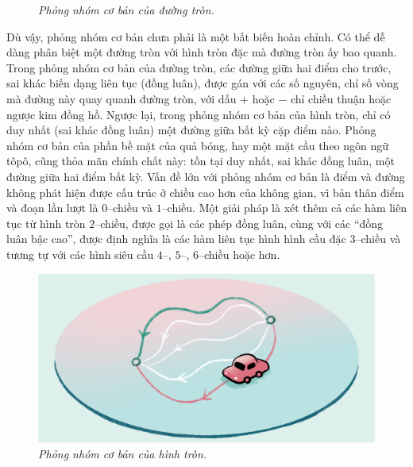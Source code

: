 \begin{multicols}{2}
\begin{figure}[H]
		\caption{\small\textit{\color{duongvaotoanhoc}Phỏng nhóm cơ bản của đường tròn.}}
		\vspace*{-10pt}
	\end{figure}
	Dù vậy, phỏng nhóm cơ bản chưa phải là một bất biến hoàn chỉnh. Có thể dễ dàng phân biệt một đường tròn với hình tròn đặc mà đường tròn ấy bao quanh. Trong phỏng nhóm cơ bản của đường tròn, các đường giữa hai điểm cho trước, sai khác biến dạng liên tục (đồng luân), được gán với các số nguyên, chỉ số vòng mà đường này quay quanh đường tròn, với dấu $+$ hoặc $-$ chỉ chiều thuận hoặc ngược kim đồng hồ. Ngược lại, trong phỏng nhóm cơ bản của hình tròn, chỉ có duy nhất (sai khác đồng luân) một đường giữa bất kỳ cặp điểm nào. Phỏng nhóm cơ bản của phần bề mặt của quả bóng, hay một mặt cầu theo ngôn ngữ tôpô, cũng thỏa mãn chính chất này: tồn tại duy nhất, sai khác đồng luân, một đường giữa hai điểm bất kỳ.
	\vskip 0.1cm
	Vấn đề lớn với phỏng nhóm cơ bản là điểm và đường không phát hiện được cấu trúc ở chiều cao hơn của không gian, vì bản thân điểm và đoạn lần lượt là $0$--chiều và $1$--chiều. Một giải pháp là xét thêm cả các hàm liên tục từ hình tròn $2$--chiều, được gọi là các phép đồng luân, cùng với các ``đồng luân bậc cao'', được định nghĩa là các hàm liên tục hình hình cầu đặc $3$--chiều và tương tự với các hình siêu cầu $4$--, $5$--, $6$--chiều hoặc hơn.
	\begin{figure}[H]
		\centering
		\vspace*{-5pt}
		\captionsetup{labelformat= empty, justification=centering}
		\includegraphics[width=1\linewidth]{9}
		\caption{\small\textit{\color{duongvaotoanhoc}Phỏng nhóm cơ bản của hình tròn.}}
		\vspace*{-10pt}
	\end{figure}

\end{multicols}
